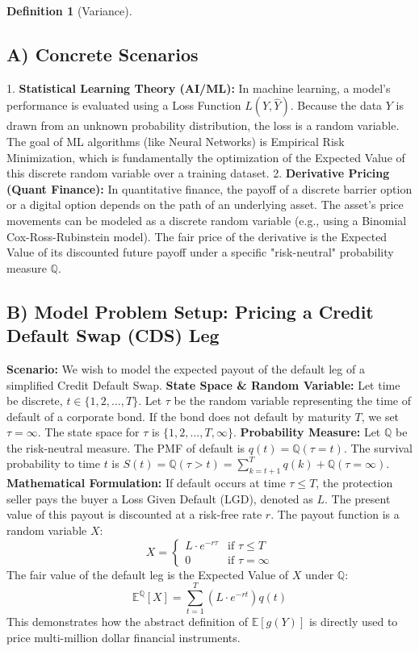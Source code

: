 \documentclass[11pt,letterpaper]{article}
\theoremstyle{definition}
\newtheorem{definition}{Definition}[section]
\theoremstyle{plain}
\theoremstyle{remark}
\newcommand{\E}{\mathbb{E}}
\begin{document}
\begin{definition}[Variance]
\subsection{A) Concrete Scenarios}
1. \textbf{Statistical Learning Theory (AI/ML):} In machine learning, a model's performance is evaluated using a Loss Function $L(Y, \hat{Y})$. Because the data $Y$ is drawn from an unknown probability distribution, the loss is a random variable. The goal of ML algorithms (like Neural Networks) is Empirical Risk Minimization, which is fundamentally the optimization of the Expected Value of this discrete random variable over a training dataset.
2. \textbf{Derivative Pricing (Quant Finance):} In quantitative finance, the payoff of a discrete barrier option or a digital option depends on the path of an underlying asset. The asset's price movements can be modeled as a discrete random variable (e.g., using a Binomial Cox-Ross-Rubinstein model). The fair price of the derivative is the Expected Value of its discounted future payoff under a specific "risk-neutral" probability measure $\mathbb{Q}$.

\subsection{B) Model Problem Setup: Pricing a Credit Default Swap (CDS) Leg}
\textbf{Scenario:} We wish to model the expected payout of the default leg of a simplified Credit Default Swap. 
\textbf{State Space \& Random Variable:} Let time be discrete, $t \in \{1, 2, \dots, T\}$. Let $\tau$ be the random variable representing the time of default of a corporate bond. If the bond does not default by maturity $T$, we set $\tau = \infty$. The state space for $\tau$ is $\{1, 2, \dots, T, \infty\}$.
\textbf{Probability Measure:} Let $\mathbb{Q}$ be the risk-neutral measure. The PMF of default is $q(t) = \mathbb{Q}(\tau = t)$. The survival probability to time $t$ is $S(t) = \mathbb{Q}(\tau > t) = \sum_{k=t+1}^T q(k) + \mathbb{Q}(\tau = \infty)$.
\textbf{Mathematical Formulation:} If default occurs at time $\tau \le T$, the protection seller pays the buyer a Loss Given Default (LGD), denoted as $L$. The present value of this payout is discounted at a risk-free rate $r$. The payout function is a random variable $X$:
\[ X = \begin{cases} L \cdot e^{-r \tau} & \text{if } \tau \le T \\ 0 & \text{if } \tau = \infty \end{cases} \]
The fair value of the default leg is the Expected Value of $X$ under $\mathbb{Q}$:
\[ \E^\mathbb{Q}[X] = \sum_{t=1}^T \left( L \cdot e^{-rt} \right) q(t) \]
This demonstrates how the abstract definition of $\E[g(Y)]$ is directly used to price multi-million dollar financial instruments.


\end{definition}
\end{document}

